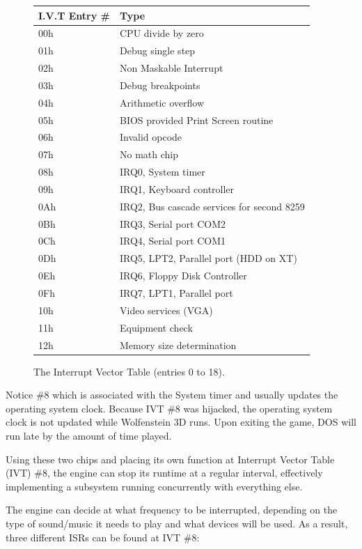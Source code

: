 \begin{figure}[H]
	\centering
	\begin{tabularx}{\textwidth}{ l p{}  }
	  \toprule
	  \textbf{I.V.T Entry \#} & \textbf{Type} \\ \bottomrule

	  00h	&	CPU divide by zero \\
01h	&	Debug single step \\
02h	&	Non Maskable Interrupt \\
03h	&	Debug breakpoints \\
04h	&	Arithmetic overflow \\
05h	&	BIOS provided Print Screen routine \\
06h	&	Invalid opcode \\
07h	&	No math chip \\
08h & IRQ0, System timer \\
09h & IRQ1, Keyboard controller \\
0Ah & IRQ2, Bus cascade services for second 8259 \\
0Bh & IRQ3, Serial port COM2 \\ 
0Ch & IRQ4, Serial port COM1 \\
0Dh & IRQ5, LPT2, Parallel port (HDD on XT) \\
0Eh & IRQ6, Floppy Disk Controller \\
0Fh & IRQ7, LPT1, Parallel port \\
10h & Video services (VGA)\\
11h & Equipment check \\
12h & Memory size determination \\
		\bottomrule
	\end{tabularx}
	\caption{The Interrupt Vector Table (entries 0 to 18).}
\end{figure}
Notice \#8 which is associated with the System timer and usually updates the operating system clock. Because IVT \#8 was hijacked, the operating system clock is not updated while Wolfenstein 3D runs. Upon exiting the game, DOS will run late by the amount of time played.\\
\par
Using these two chips and placing its own function at Interrupt Vector Table (IVT) \#8, the engine can stop its runtime at a regular interval, effectively implementing a subsystem running concurrently with everything else.\\
\par
The engine can decide at what frequency to be interrupted, depending on the type of sound/music it needs to play and what devices will be used. As a result, three different ISRs can be found at IVT \#8: 
